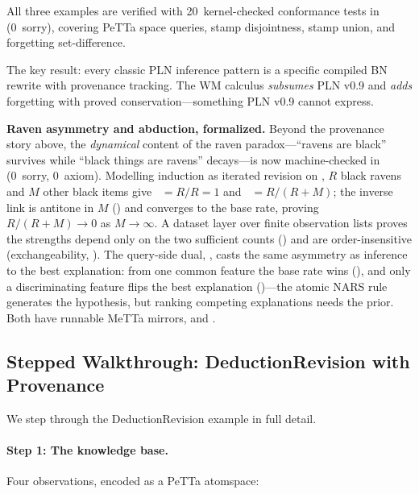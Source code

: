 \documentclass[11pt,openany]{report}
\begin{document}
\noindent
All three examples are verified with 20~kernel-checked conformance
tests in 
(0~sorry), covering PeTTa space queries, stamp disjointness,
stamp union, and forgetting set-difference.

The key result: every classic PLN inference pattern is a specific
compiled BN rewrite with provenance tracking.  The WM calculus
\emph{subsumes} PLN v0.9 and \emph{adds} forgetting with proved
conservation---something PLN v0.9 cannot express.

\medskip\noindent\textbf{Raven asymmetry and abduction, formalized.}
Beyond the provenance story above, the \emph{dynamical} content of the raven
paradox---``ravens are black'' survives while ``black things are ravens''
decays---is now machine-checked in
 (0~sorry, 0~axiom).
Modelling induction as iterated revision on , $R$ black
ravens and $M$ other black items give ~$=R/R=1$ and
~$=R/(R+M)$; the inverse link is antitone in $M$
() and converges to the base rate,
 proving $R/(R+M)\to 0$ as
$M\to\infty$.  A dataset layer over finite observation lists proves the
strengths depend only on the two sufficient counts
() and are order-insensitive
(exchangeability, ).  The query-side dual,
, casts the same asymmetry as
inference to the best explanation: from one common feature the base rate wins
(), and only a discriminating feature flips the best
explanation ()---the atomic NARS
 rule generates the hypothesis, but ranking competing
explanations needs the prior.  Both have runnable MeTTa mirrors,
 and
.

\subsection{Stepped Walkthrough: DeductionRevision with Provenance}

We step through the DeductionRevision example in full detail.

\paragraph{Step 1: The knowledge base.}
Four observations, encoded as a PeTTa atomspace:
\end{document}
